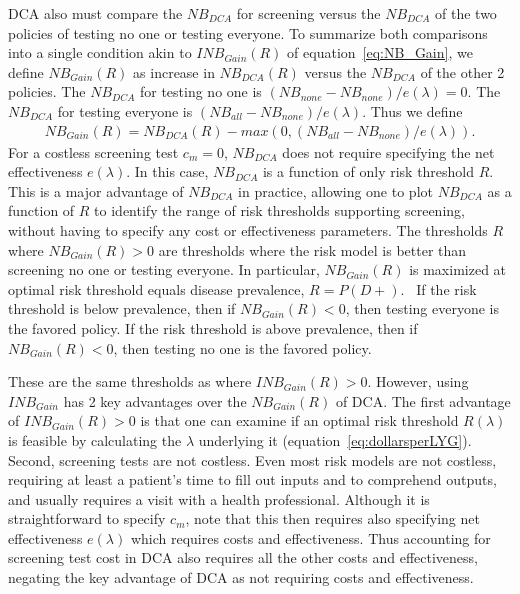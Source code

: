\documentclass[AMA,STIX1COL]{WileyNJD-v2}
\begin{document}
DCA also must compare the $N\!B_{DCA}$ for screening versus the $N\!B_{DCA}$ of the two policies of testing no one or testing everyone.  To summarize both comparisons into a single condition akin to $I\!N\!B_{Gain}(R)$ of equation~\ref{eq:NB_Gain}, we define $N\!B_{Gain}(R)$ as increase in $N\!B_{DCA}(R)$ versus the $N\!B_{DCA}$ of the other 2 policies\cite{Katki2019}.  The $N\!B_{DCA}$ for testing no one is $(N\!B_{none} - N\!B_{none})/e(\lambda)=0$.  The $N\!B_{DCA}$ for testing everyone is $(N\!B_{all} - N\!B_{none})/e(\lambda)$.  Thus we define 
\begin{eqnarray*}
	N\!B_{Gain}(R) = N\!B_{DCA}(R) - max(0,(N\!B_{all} - N\!B_{none})/e(\lambda)).
\end{eqnarray*}
For a costless screening test $c_m=0$, $N\!B_{DCA}$ does not require specifying the net effectiveness $e(\lambda)$.  In this case, $N\!B_{DCA}$ is a function of only risk threshold $R$.  This is a major advantage of $N\!B_{DCA}$ in practice, allowing one to plot $N\!B_{DCA}$ as a function of $R$ to identify the range of risk thresholds supporting screening, without having to specify any cost or effectiveness parameters.  The thresholds $R$ where $N\!B_{Gain}(R)>0$ are thresholds where the risk model is better than screening no one or testing everyone.  In particular, $N\!B_{Gain}(R)$ is maximized at optimal risk threshold equals disease prevalence, $R=P(D+)$.~\cite{Katki2019}  If the risk threshold is below prevalence, then if $N\!B_{Gain}(R)<0$, then testing everyone is the favored policy.   If the risk threshold is above prevalence, then if $N\!B_{Gain}(R)<0$, then testing no one is the favored policy. 

These are the same thresholds as where $I\!N\!B_{Gain}(R)>0$.  However, using $I\!N\!B_{Gain}$ has 2 key advantages over the $N\!B_{Gain}(R)$ of DCA.  The first advantage of $I\!N\!B_{Gain}(R)>0$ is that one can examine if an optimal risk threshold $R(\lambda)$ is feasible by calculating the $\lambda$ underlying it (equation~\ref{eq:dollarsperLYG}).  Second, screening tests are not costless.  Even most risk models are not costless, requiring at least a patient's time to fill out inputs and to comprehend outputs, and usually requires a visit with a health professional.  Although it is straightforward to specify $c_m$, note that this then requires also specifying net effectiveness $e(\lambda)$ which requires costs and effectiveness.  Thus accounting for screening test cost in DCA also requires all the other costs and effectiveness, negating the key advantage of DCA as not requiring costs and effectiveness.    
\end{document}
